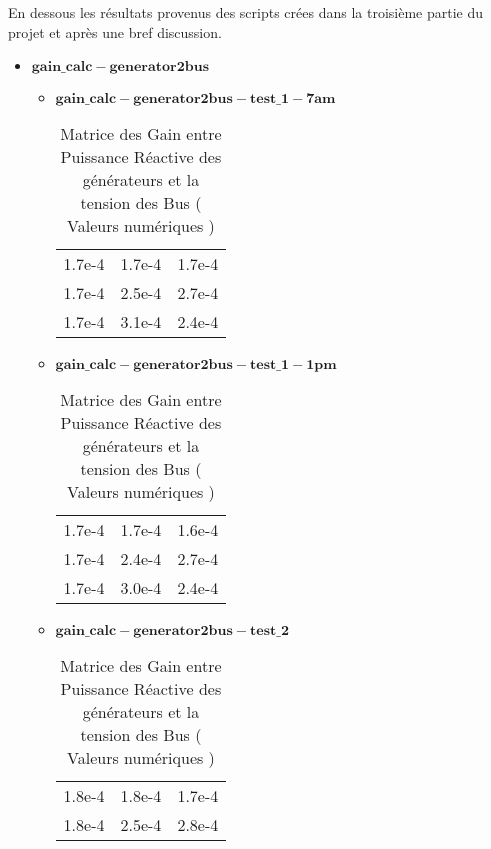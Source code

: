 En dessous les résultats provenus des scripts crées dans la troisième partie du projet et après une bref discussion. 

\begin{itemize}
\item $\mathbf{gain\_calc-generator2bus}$\\
\begin{itemize}
	
\item $\mathbf{gain\_calc-generator2bus-test\_1-7am}$
\begin{table}[H]
	\captionsetup{justification=centering,margin=2cm}
	\caption{Matrice des Gain entre Puissance Réactive des générateurs et la tension des Bus ( Valeurs numériques )}
	\centering
	\begin{tabular}{ccc}
		1.7e-4&1.7e-4&1.7e-4\\
		1.7e-4&2.5e-4&2.7e-4\\
		1.7e-4&3.1e-4&2.4e-4\\
	\end{tabular}
\end{table}

\item $\mathbf{gain\_calc-generator2bus-test\_1-1pm}$
\begin{table}[H]
	\captionsetup{justification=centering,margin=2cm}
	\caption{Matrice des Gain entre Puissance Réactive des générateurs et la tension des Bus ( Valeurs numériques )}
	\centering
	\begin{tabular}{ccc}
		1.7e-4&1.7e-4&1.6e-4\\
		1.7e-4&2.4e-4&2.7e-4\\
		1.7e-4&3.0e-4&2.4e-4\\
	\end{tabular}
	
\end{table}

\item $\mathbf{gain\_calc-generator2bus-test\_2}$
\begin{table}[H]
	\captionsetup{justification=centering,margin=2cm}
	\caption{Matrice des Gain entre Puissance Réactive des générateurs et la tension des Bus ( Valeurs numériques )}
	\centering
	\begin{tabular}{ccc}
		
		1.8e-4&1.8e-4&1.7e-4\\
		
		1.8e-4&2.5e-4&2.8e-4\\
		

\end{tabular}
\end{table}
\end{itemize}
\end{itemize}
